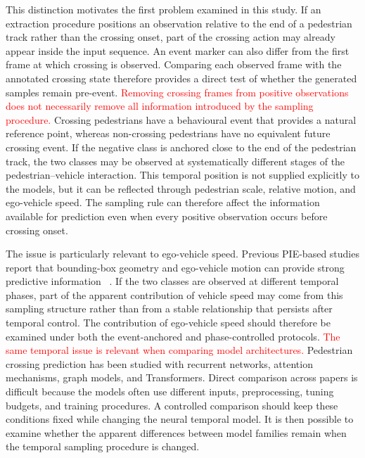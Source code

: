 \documentclass[mti,article,submit,moreauthors]{Definitions/mdpi}
\begin{document}
This distinction motivates the first problem examined in this study. If an extraction
procedure positions an observation relative to the end of a pedestrian track rather than the
crossing onset, part of the crossing action may already appear inside the input sequence. An
event marker can also differ from the first frame at which crossing is observed. Comparing
each observed frame with the annotated crossing state therefore provides a direct test of
whether the generated samples remain pre-event. 
\textcolor{red}{Removing crossing frames from positive observations does not necessarily remove all information introduced by the sampling procedure.} Crossing pedestrians have a behavioural event that provides a natural
reference point, whereas non-crossing pedestrians have no equivalent future crossing event.
If the negative class is anchored close to the end of the pedestrian track, the two classes may
be observed at systematically different stages of the pedestrian--vehicle interaction. This
temporal position is not supplied explicitly to the models, but it can be reflected through
pedestrian scale, relative motion, and ego-vehicle speed. The sampling rule can therefore
affect the information available for prediction even when every positive observation occurs
before crossing onset.

The issue is particularly relevant to ego-vehicle speed. Previous PIE-based studies report that bounding-box geometry and ego-vehicle motion can provide strong predictive information
~\citep{lorenzo2021intformer,azarmi2024featureimportance,chen2024pedcmt}. If the two classes are observed at different temporal phases, part of the apparent contribution of vehicle speed may come from this sampling structure rather than from a stable relationship that persists after temporal control. The contribution of ego-vehicle speed should therefore be examined under both the event-anchored and phase-controlled protocols. \textcolor{red}{The same temporal issue is relevant when comparing model architectures.} Pedestrian crossing prediction has been studied with recurrent networks, attention mechanisms, graph models, and Transformers. Direct comparison across papers is difficult because the models often use different inputs, preprocessing, tuning budgets, and training procedures. A controlled comparison should keep these conditions fixed while changing the neural temporal model. It is then possible to examine whether the apparent differences between model families remain when the temporal sampling procedure is changed.
\end{document}

